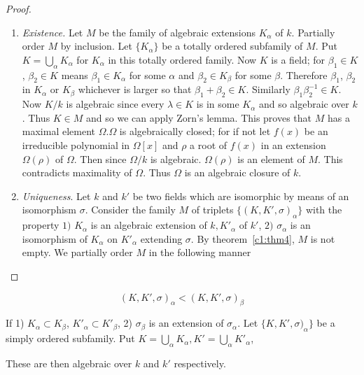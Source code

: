 \begin{proof}
\begin{enumerate}[1)]
\item  \textit{Existence.}  Let $M$ be the family of algebraic
  extensions $K_{\alpha}$ of  $k$. Partially order $M$ by
  inclusion. Let $ \{ K_\alpha \}$ be a totally ordered subfamily of
  $M$. Put $ K = \bigcup\limits_{\alpha} K_\alpha $ for  $K_\alpha $
  in  this totally ordered family. Now $K$ is a field; for $\beta_1
  \in K$, $ \beta_2 \in K$  means $\beta_1 \in K_\alpha$ for some
  $\alpha$ and $\beta_2 \in K_\beta$ for some $\beta$. Therefore
  $\beta_1$, $\beta_2$ in  $K_\alpha $ or $K_\beta $ whichever is
  larger  so that $ \beta_1 + \beta_2 \in K $. Similarly $ \beta_1
  \beta^{-1}_2  \in K $.  Now $ K /k $ is algebraic since every  $
  \lambda \in K $ is in some $ K_\alpha $ and so algebraic over $
  k$. Thus $K \in M $ and so we can apply Zorn's
  lemma. This proves that $ M $ has a maximal element  $\Omega
  . \Omega $ is algebraically closed; for if not let  $f(x)$ be an
  irreducible  polynomial in $\Omega [ x ]$ and $\rho$ a root of $f
  (x)$ in an extension $\Omega ( \rho)$ of $\Omega $. Then since
  $\Omega /k $  is algebraic. $ \Omega ( \rho ) $ is an element of
  $M$. This  contradicts  maximality of $ \Omega $. Thus $ \Omega $ is
  an algebraic  closure of $k$. 

\item \textit{Uniqueness}. Let $k$ and  $k'$ be two fields  which are
  isomorphic by means of an isomorphism $\sigma $. Consider the family
  $M$ of triplets  $ \{ ( K, K', \sigma  )_\alpha \} $ with the
  property   $ 1) $ $K_\alpha $ is an algebraic extension of $k,
  K'_\alpha $ of $ k'$, $ 2) $ $ \sigma_{\alpha} $ is  an
  isomorphism of $K_\alpha $ on $ K'_\alpha $ extending $ \sigma
  $. By theorem~\ref{c1:thm4}, $M$ is not empty. We partially order
  $M$ in the   following manner  
 \end{enumerate}
 \end{proof} 
 $$
 (K, K', \sigma )_\alpha < ( K, K', \sigma )_\beta 
 $$
 
 If  1) $ K_\alpha \subset K_\beta $, $ K'_\alpha \subset K'_\beta
 $, 2)  $ \sigma_\beta$ is  an extension of $\sigma_\alpha$. Let
 $\{ K, K', \sigma )_\alpha \} $ be a simply ordered subfamily. Put $
 K = \bigcup\limits_{\alpha} K_\alpha, K'  = \bigcup\limits_{\alpha}
 K'_\alpha$, 
 
These are then algebraic over $k$ and $k'$ respectively.
 
